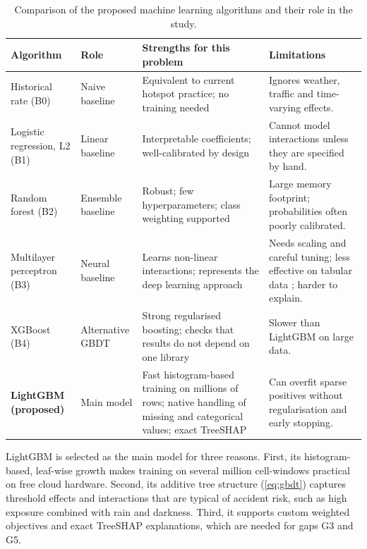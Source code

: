 \begin{table}[t]
\centering
\caption{Comparison of the proposed machine learning algorithms and their role in the study.}
\label{tab:algorithms}
\footnotesize
\begin{tabularx}{\textwidth}{L{2.6cm} L{1.9cm} Y Y}
\toprule
\textbf{Algorithm} & \textbf{Role} & \textbf{Strengths for this problem} & \textbf{Limitations} \\
\midrule
Historical rate (B0) & Naive baseline & Equivalent to current hotspot practice; no training needed & Ignores weather, traffic and time-varying effects. \\
Logistic regression, L2 (B1) \cite{hastie2009elements} & Linear baseline & Interpretable coefficients; well-calibrated by design & Cannot model interactions unless they are specified by hand. \\
Random forest (B2) \cite{breiman2001random} & Ensemble baseline & Robust; few hyperparameters; class weighting supported & Large memory footprint; probabilities often poorly calibrated. \\
Multilayer perceptron (B3) \cite{goodfellow2016deep} & Neural baseline & Learns non-linear interactions; represents the deep learning approach & Needs scaling and careful tuning; less effective on tabular data \cite{grinsztajn2022tree}; harder to explain. \\
XGBoost (B4) \cite{chen2016xgboost} & Alternative GBDT & Strong regularised boosting; checks that results do not depend on one library & Slower than LightGBM on large data. \\
\textbf{LightGBM (proposed)} \cite{ke2017lightgbm} & Main model & Fast histogram-based training on millions of rows; native handling of missing and categorical values; exact TreeSHAP & Can overfit sparse positives without regularisation and early stopping. \\
\bottomrule
\end{tabularx}
\end{table}

LightGBM is selected as the main model for three reasons. First, its histogram-based, leaf-wise growth makes training on several million cell-windows practical on free cloud hardware. Second, its additive tree structure (\cref{eq:gbdt}) captures threshold effects and interactions that are typical of accident risk, such as high exposure combined with rain and darkness. Third, it supports custom weighted objectives and exact TreeSHAP explanations, which are needed for gaps G3 and G5.

